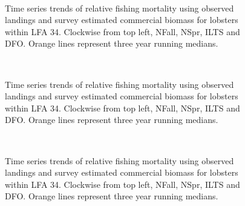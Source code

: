 \documentclass[11pt]{article}
\newcommand{\e}{/SpinDr/backup/bio_data/bio.lobster/figures/LFA34Update/}
\begin{document}
\begin{figure}
        \centering
    \\
        
         \caption{Time series trends of relative fishing mortality using observed landings and survey estimated commercial biomass for lobsters within LFA 34. Clockwise from top left, NFall, NSpr, ILTS and DFO. Orange lines represent three year running medians.}
        \end{figure}


\begin{figure}
        \centering
    \\
        
         \caption{Time series trends of relative fishing mortality using observed landings and survey estimated commercial biomass for lobsters within LFA 34. Clockwise from top left, NFall, NSpr, ILTS and DFO. Orange lines represent three year running medians.}
        \end{figure}



\begin{figure}
        \centering
    \\
        
         \caption{Time series trends of relative fishing mortality using observed landings and survey estimated commercial biomass for lobsters within LFA 34. Clockwise from top left, NFall, NSpr, ILTS and DFO. Orange lines represent three year running medians.}
        \end{figure}
\end{document}
